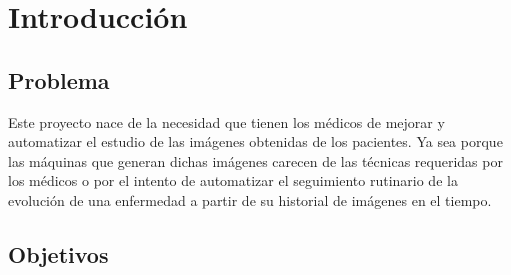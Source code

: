 \chapter{Introducción}
\section{Problema}
Este proyecto nace de la necesidad que tienen los médicos de mejorar y
automatizar el estudio de las imágenes obtenidas de los pacientes. Ya
sea porque las máquinas que generan dichas imágenes carecen de las
técnicas requeridas por los médicos o por el intento de automatizar el
seguimiento rutinario de la evolución de una enfermedad a partir de su
historial de imágenes en el tiempo. \\
\section{Objetivos}

